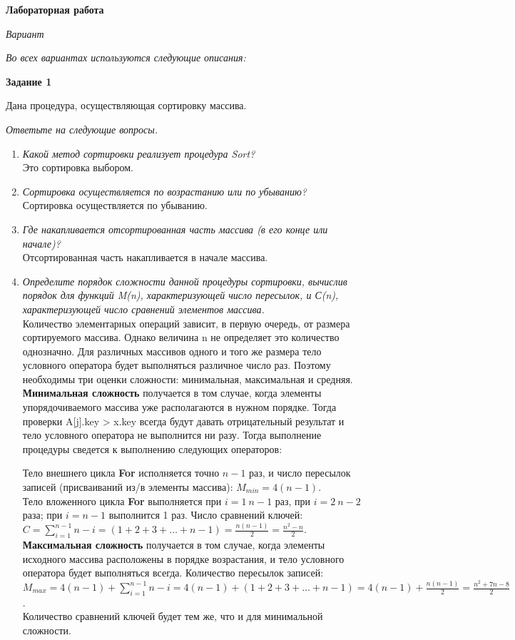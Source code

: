 \documentclass[a4paper,12pt]{report}
\DeclareRobustCommand{\clist}[1]
{
  
}
\DeclareRobustCommand{\task}[1]
{
  {\bf Задание #1}
  \par
}
\DeclareRobustCommand{\unitem}[1]
{
  \item {\it #1} \\
}
\begin{document}
\begin{center}
{\large \bf Лабораторная работа }

{\it Вариант }
\end{center}
{\it Во всех вариантах используются следующие описания:}
\clist{0.pas}
\task{1}
Дана процедура, осуществляющая сортировку массива.
\clist{1-0.pas}
{\it Ответьте на следующие вопросы.}
\begin{enumerate}[leftmargin = 10pt]
\unitem{Какой метод сортировки реализует процедура Sort?}
Это сортировка выбором.
\unitem{Сортировка осуществляется по возрастанию или по убыванию?}
Сортировка осуществляется по убыванию.
\unitem{Где накапливается отсортированная часть массива (в его конце или
начале)?}
Отсортированная часть накапливается в начале массива.
\unitem{Определите порядок сложности данной процедуры сортировки, вычислив 
порядок для функций M(n), характеризующей число пересылок, и С(n), 
характеризующей число сравнений элементов массива.}
Количество элементарных операций зависит, в первую очередь, от размера 
сортируемого массива. Однако величина n не определяет это количество 
однозначно. Для различных массивов одного и того же размера тело 
условного оператора будет выполняться различное число раз. Поэтому 
необходимы три оценки сложности: минимальная, максимальная и средняя.\\
{\bf Минимальная сложность} получается в том случае, когда элементы 
упорядочиваемого массива уже располагаются в нужном порядке. Тогда проверки 
A[j].key > x.key всегда будут давать отрицательный результат и тело условного
оператора не выполнится ни разу. Тогда выполнение процедуры сведется к выполнению 
следующих операторов:
\clist{1-1.pas}
Тело внешнего цикла {\bf For} исполняется точно $n-1$ раз, и число пересылок записей
(присваиваний из/в элементы массива): 
$M_{min} = 4(n-1)$.\\
Тело вложенного цикла {\bf For} выполняется 
при $i = 1~n-1$ раз, при $i = 2~n-2$ раза; при $i = n-1$ выполнится 1 раз.
Число сравнений ключей: $C = \sum\limits_{i=1}^{n-1}n-i = (1 + 2 +
3 + \dots + n-1) = \frac{n(n-1)}{2} = \frac{n^2 - n}{2}$.\\
{\bf Максимальная сложность} получается в том случае, когда элементы исходного 
массива расположены в порядке возрастания, и тело условного оператора будет
выполняться всегда. 
Количество пересылок записей:
$M_{max} = 4(n-1) + \sum\limits_{i=1}^{n-1}n-i = 4(n-1) + (1 + 2 + 3 + \dots +
n-1) = 4(n-1) + \frac{n(n-1)}{2} = \frac{n^2 + 7n - 8}{2}$.\\
Количество сравнений ключей будет тем же, что и для минимальной сложности.\\

\end{enumerate}
\end{document}
